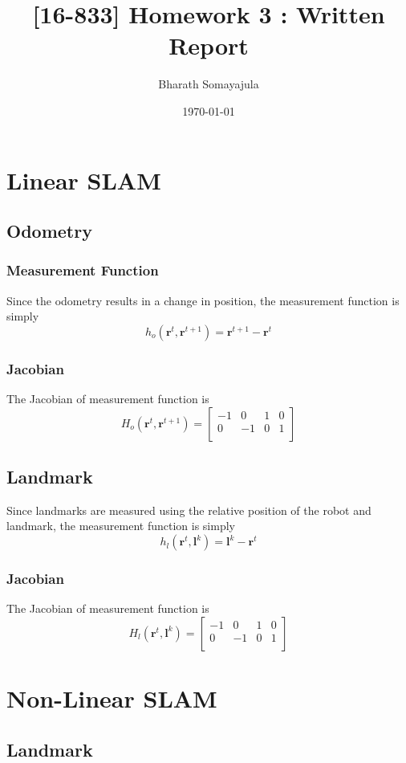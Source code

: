 \documentclass[12pt, a4paper]{article}
\title{[16-833] Homework 3 : Written Report}
\author{Bharath Somayajula}
\date{\today}
\begin{document}
\maketitle

\tableofcontents
\section{Linear SLAM}
\subsection{Odometry}
\subsubsection{Measurement Function}
Since the odometry results in a change in position, the measurement function is simply
\[h_o(\mathbf{r}^t, \mathbf{r}^{t+1}) = \mathbf{r}^{t+1} - \mathbf{r}^t\]
\subsubsection{Jacobian}
The Jacobian of measurement function is
\[H_o(\mathbf{r}^t, \mathbf{r}^{t+1}) = \begin{bmatrix}
  -1 & 0 & 1 & 0\\
  0 & -1 & 0 & 1\\
\end{bmatrix}\]
\subsection{Landmark}
Since landmarks are measured using the relative position of the robot and landmark, the measurement function is simply
\[h_l(\mathbf{r}^t, \mathbf{l}^{k}) = \mathbf{l}^{k} - \mathbf{r}^t\]
\subsubsection{Jacobian}
The Jacobian of measurement function is
\[H_l(\mathbf{r}^t, \mathbf{l}^{k}) = \begin{bmatrix}
  -1 & 0 & 1 & 0\\
  0 & -1 & 0 & 1\\
\end{bmatrix}\]

\section{Non-Linear SLAM}
\subsection{Landmark}
\end{document}
